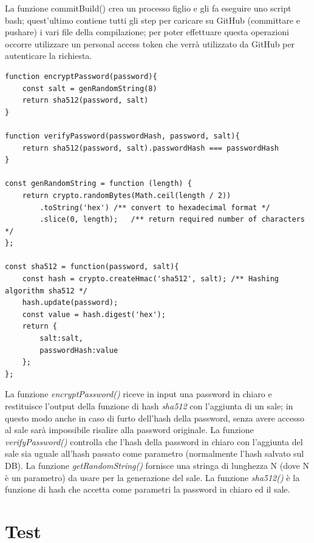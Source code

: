 \documentclass{report}
\begin{document}
La funzione commitBuild() crea un processo figlio e gli fa eseguire uno script bash; quest'ultimo contiene tutti gli step per caricare su GitHub (committare e pushare) i vari file della compilazione; per poter effettuare questa operazioni occorre utilizzare un personal access token che verrà utilizzato da GitHub per autenticare la richiesta.
\begin{lstlisting}
function encryptPassword(password){
    const salt = genRandomString(8)
    return sha512(password, salt)
}

function verifyPassword(passwordHash, password, salt){
    return sha512(password, salt).passwordHash === passwordHash
}

const genRandomString = function (length) {
    return crypto.randomBytes(Math.ceil(length / 2))
        .toString('hex') /** convert to hexadecimal format */
        .slice(0, length);   /** return required number of characters */
};

const sha512 = function(password, salt){
    const hash = crypto.createHmac('sha512', salt); /** Hashing algorithm sha512 */
    hash.update(password);
    const value = hash.digest('hex');
    return {
        salt:salt,
        passwordHash:value
    };
};
\end{lstlisting}
La funzione \textit{encryptPassword()} riceve in input una password in chiaro e restituisce l'output della funzione di hash \textit{sha512} con l'aggiunta di un sale; in questo modo anche in caso di furto dell'hash della password, senza avere accesso al sale sarà impossibile risalire alla password originale.
La funzione \textit{verifyPassword()} controlla che l'hash della password in chiaro con l'aggiunta del sale sia uguale all'hash passato come parametro (normalmente l'hash salvato sul DB).
La funzione \textit{getRandomString()} fornisce una stringa di lunghezza N (dove N è un parametro) da usare per la generazione del sale.
La funzione \textit{sha512() }è la funzione di hash che accetta come parametri la password in chiaro ed il sale.

\section{Test}
\end{document}
